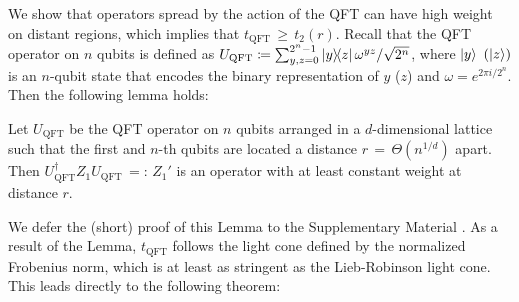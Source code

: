We show that operators spread by the action of the QFT can have high weight on distant regions,
which implies that $t_\mathrm{QFT}$\,$\geq$\,$t_2(r)$.
Recall that the QFT operator on $n$ qubits is defined as $U_\mathrm{QFT} \coloneqq \sum_{y,z=0}^{2^n-1} \ketbra{y}{z} {\omega^{yz}}/{\sqrt{2^n}}$, where $\left | y \right\rangle$ $(\left | z \right\rangle)$ is an $n$-qubit state that encodes the binary representation of $y$ ($z$) and $\omega = e^{2\pi i/2^n}$.
Then the following lemma holds:
\begin{lemma*} \label{lem_qft_weight}
Let $U_\mathrm{QFT}$ be the QFT operator on $n$ qubits arranged in a $d$-dimensional lattice such that the first and $n$-th qubits are located a distance $r$\,$=$\,$\Theta(n^{1/d})$ apart.
Then $U_\mathrm{QFT}^\dag Z_1 U_\mathrm{QFT}$\,$=:$\,$Z_1' $ is an operator with at least constant weight at distance $r$.
\end{lemma*}

We defer the (short) proof of this Lemma to the Supplementary Material \cite{SM}.
As a result of the Lemma, $t_\mathrm{QFT}$ follows the light cone defined by the normalized Frobenius norm, which is at least as stringent as the Lieb-Robinson light cone.
This leads directly to the following theorem:
%


